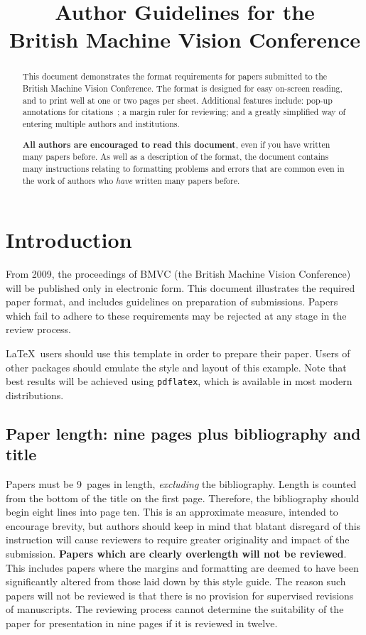 \documentclass{bmvc2k}
\title{Author Guidelines for the\\ British Machine Vision Conference}
\begin{document}
\maketitle

\begin{abstract}
This document demonstrates the format requirements for papers submitted
to the British Machine Vision Conference.  The format is designed for
easy on-screen reading, and to print well at one or two pages per sheet.
Additional features include: pop-up annotations for
citations~\cite{Authors06,Mermin89}; a margin ruler for reviewing; and a
greatly simplified way of entering multiple authors and institutions.

{\bf All authors are encouraged to read this document}, even if you have
written many papers before.  As well as a description of the format, the
document contains many instructions relating to formatting problems and
errors that are common even in the work of authors who {\em have}
written many papers before.
\end{abstract}

\section{Introduction}
\label{sec:intro}
From 2009, the proceedings of BMVC (the British Machine Vision
Conference) will be published only in electronic form.  This document
illustrates the required paper format, and includes guidelines on
preparation of submissions.  Papers which fail to adhere to these
requirements may be rejected at any stage in the review process.

\LaTeX\ users should use this template in order to prepare their paper.
Users of other packages should emulate the style and layout of this
example.  Note that best results will be achieved using {\tt pdflatex},
which is available in most modern distributions.

\subsection{Paper length: nine pages plus bibliography and title}
Papers must be 9~pages in length, {\em excluding} the bibliography.  Length
is counted from the bottom of the title on the first page.  Therefore, the
bibliography should begin eight lines into page ten.  This is an
approximate measure, intended to encourage brevity, but authors should keep
in mind that blatant disregard of this instruction will cause reviewers to
require greater originality and impact of the submission.  {\bf Papers which are
clearly overlength will not be reviewed}.  This includes papers where the
margins and formatting are deemed to have been significantly altered from
those laid down by this style guide.  The reason such papers will not be
reviewed is that there is no provision for supervised revisions of
manuscripts.  The reviewing process cannot determine the suitability of the
paper for presentation in nine pages if it is reviewed in twelve.
\end{document}
